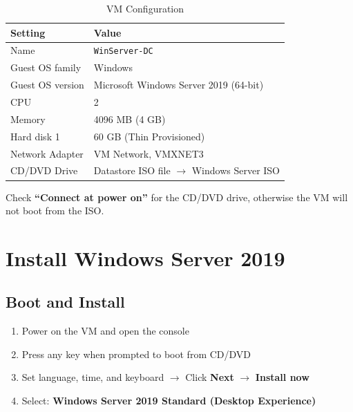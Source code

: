 ﻿\documentclass[12pt,a4paper]{article}
\begin{document}
\begin{table}[H]
\centering
\begin{tabularx}{0.85\textwidth}{l X}
\toprule
\textbf{Setting} & \textbf{Value} \\
\midrule
Name               & \texttt{WinServer-DC} \\
Guest OS family    & Windows \\
Guest OS version   & Microsoft Windows Server 2019 (64-bit) \\
CPU                & 2 \\
Memory             & 4096 MB (4 GB) \\
Hard disk 1        & 60 GB (Thin Provisioned) \\
Network Adapter    & VM Network, VMXNET3 \\
CD/DVD Drive       & Datastore ISO file $\rightarrow$ Windows Server ISO \\
\bottomrule
\end{tabularx}
\caption{VM Configuration}
\end{table}

\begin{warningbox}
Check \textbf{``Connect at power on''} for the CD/DVD drive, otherwise the VM will not boot from the ISO.
\end{warningbox}

\section{Install Windows Server 2019}

\subsection{Boot and Install}

\begin{enumerate}
    \item Power on the VM and open the console
    \item Press any key when prompted to boot from CD/DVD
    \item Set language, time, and keyboard $\rightarrow$ Click \textbf{Next} $\rightarrow$ \textbf{Install now}
    \item Select: \textbf{Windows Server 2019 Standard (Desktop Experience)}
\end{enumerate}
\end{document}
